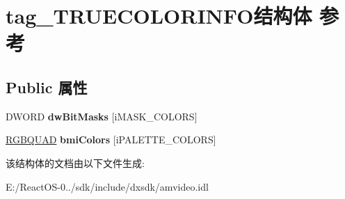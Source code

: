 \hypertarget{structtag___t_r_u_e_c_o_l_o_r_i_n_f_o}{}\section{tag\+\_\+\+T\+R\+U\+E\+C\+O\+L\+O\+R\+I\+N\+F\+O结构体 参考}
\label{structtag___t_r_u_e_c_o_l_o_r_i_n_f_o}
\subsection*{Public 属性}
\begin{DoxyCompactItemize}
\item 
\mbox{\label{structtag___t_r_u_e_c_o_l_o_r_i_n_f_o_aec966fe6baae3891d26993025bdacfe6}} 
D\+W\+O\+RD {\bfseries dw\+Bit\+Masks} \mbox{[}i\+M\+A\+S\+K\+\_\+\+C\+O\+L\+O\+RS\mbox{]}
\item 
\mbox{\label{structtag___t_r_u_e_c_o_l_o_r_i_n_f_o_afa2a32fb5992d4d7e5c3807dcde1eadc}} 
\hyperlink{structtag_r_g_b_q_u_a_d}{R\+G\+B\+Q\+U\+AD} {\bfseries bmi\+Colors} \mbox{[}i\+P\+A\+L\+E\+T\+T\+E\+\_\+\+C\+O\+L\+O\+RS\mbox{]}
\end{DoxyCompactItemize}


该结构体的文档由以下文件生成\+:\begin{DoxyCompactItemize}
\item 
E\+:/\+React\+O\+S-\/0../sdk/include/dxsdk/amvideo.\+idl\end{DoxyCompactItemize}
